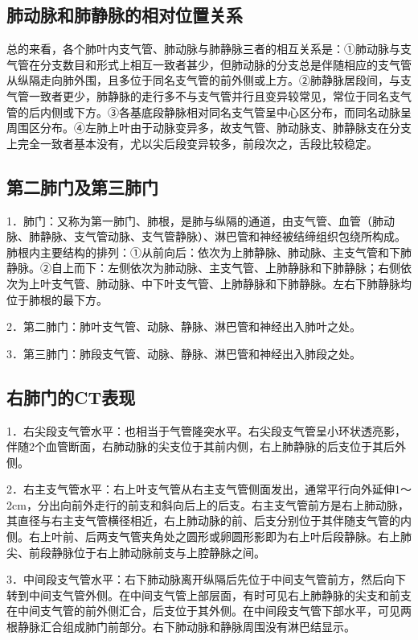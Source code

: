 \subsection{肺动脉和肺静脉的相对位置关系}

总的来看，各个肺叶内支气管、肺动脉与肺静脉三者的相互关系是：①肺动脉与支气管在分支数目和形式上相互一致者甚少，但肺动脉的分支总是伴随相应的支气管从纵隔走向肺外围，且多位于同名支气管的前外侧或上方。②肺静脉居段间，与支气管一致者更少，肺静脉的走行多不与支气管并行且变异较常见，常位于同名支气管的后内侧或下方。③各基底段静脉相对同名支气管呈中心区分布，而同名动脉呈周围区分布。④左肺上叶由于动脉变异多，故支气管、肺动脉支、肺静脉支在分支上完全一致者基本没有，尤以尖后段变异较多，前段次之，舌段比较稳定。

\subsection{第二肺门及第三肺门}

1．肺门：又称为第一肺门、肺根，是肺与纵隔的通道，由支气管、血管（肺动脉、肺静脉、支气管动脉、支气管静脉）、淋巴管和神经被结缔组织包绕所构成。肺根内主要结构的排列：①从前向后：依次为上肺静脉、肺动脉、主支气管和下肺静脉。②自上而下：左侧依次为肺动脉、主支气管、上肺静脉和下肺静脉；右侧依次为上叶支气管、肺动脉、中下叶支气管、上肺静脉和下肺静脉。左右下肺静脉均位于肺根的最下方。

2．第二肺门：肺叶支气管、动脉、静脉、淋巴管和神经出入肺叶之处。

3．第三肺门：肺段支气管、动脉、静脉、淋巴管和神经出入肺段之处。

\subsection{右肺门的CT表现}

1．右尖段支气管水平：也相当于气管隆突水平。右尖段支气管呈小环状透亮影，伴随2个血管断面，右肺动脉的尖支位于其前内侧，右上肺静脉的后支位于其后外侧。

2．右主支气管水平：右上叶支气管从右主支气管侧面发出，通常平行向外延伸1～2cm，分出向前外走行的前支和斜向后上的后支。右主支气管前方是右上肺动脉，其直径与右主支气管横径相近，右上肺动脉的前、后支分别位于其伴随支气管的内侧。右上叶前、后两支气管夹角处之圆形或卵圆形影即为右上叶后段静脉。右上肺尖、前段静脉位于右上肺动脉前支与上腔静脉之间。

3．中间段支气管水平：右下肺动脉离开纵隔后先位于中间支气管前方，然后向下转到中间支气管外侧。在中间支气管上部层面，有时可见右上肺静脉的尖支和前支在中间支气管的前外侧汇合，后支位于其外侧。在中间段支气管下部水平，可见两根静脉汇合组成肺门前部分。右下肺动脉和静脉周围没有淋巴结显示。


